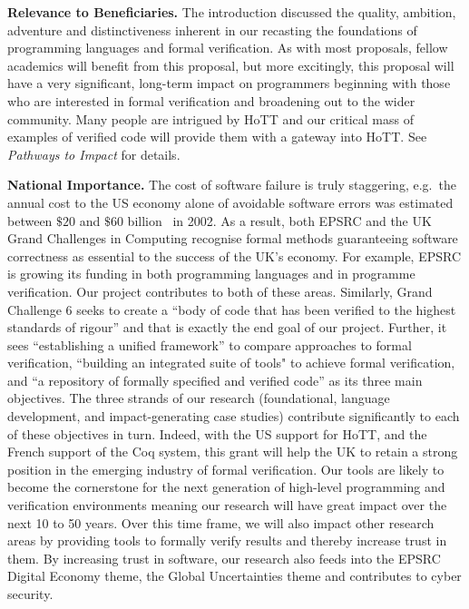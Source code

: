 \documentclass[a4paper,11pt]{article}
\newcommand{\eg}{{e.g.}\ }
\begin{document}
\vspace*{-0.1in}


{\bf Relevance to Beneficiaries.} The introduction discussed the
quality, ambition, adventure and distinctiveness inherent in our
recasting the foundations of programming languages and formal
verification. As with most proposals, fellow academics will benefit
from this proposal, but more excitingly, this proposal will have a
very significant, long-term impact on programmers beginning with those
who are interested in formal verification and broadening out to the
wider community. Many people are
intrigued by HoTT and our critical mass of examples of verified code
will provide them with a gateway into HoTT. See {\em
  Pathways to Impact} for details. 
 

{\bf National Importance.} %
The cost of software failure is truly staggering, \eg the annual cost
to the US economy alone of avoidable software errors was estimated between
$\$ 20$ and $\$60$ billion~\cite{grandchallenges} in 2002.  As a
result, both EPSRC and the UK Grand Challenges in Computing
recognise formal methods guaranteeing software correctness as
essential to the success of the UK's economy. For example, EPSRC is
growing its funding in both programming languages and in programme
verification. Our project contributes to both of these
areas. Similarly, Grand Challenge 6 seeks to create a ``body of code
that has been verified to the highest standards of rigour'' and that is
exactly the end goal of our project. Further, it sees ``establishing a
unified framework'' to compare approaches to formal verification,
``building an integrated suite of tools" to achieve formal
verification, and ``a repository of formally specified and verified
code'' as its three main objectives. The three strands of our research
(foundational, language development, and impact-generating case
studies) contribute significantly to each of these objectives in turn.
Indeed, with the US support for HoTT, and the French support of the
Coq system, this grant will help the UK to retain a strong position in
the emerging industry of formal verification. Our tools are likely to become the
cornerstone for the next generation of high-level programming
and verification environments meaning our research will
have great impact over the next 10 to 50 years. Over this time frame,
we will also impact other research areas by providing tools to
formally verify results and thereby increase trust in them. By
increasing trust in software, our research also feeds into the EPSRC
Digital Economy theme, the Global Uncertainties 
theme and contributes
to cyber security.
\end{document}
